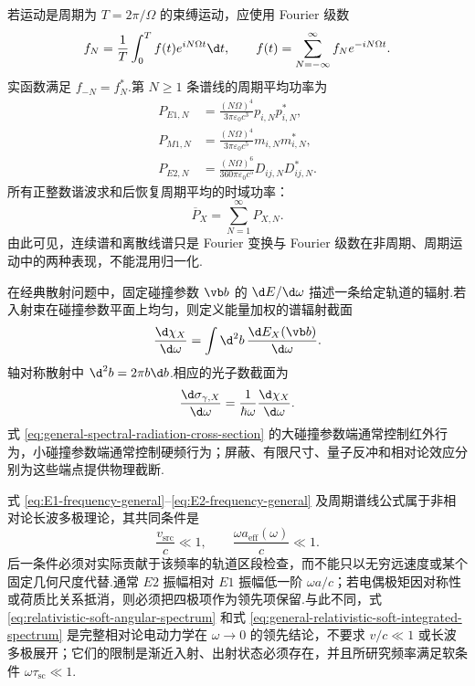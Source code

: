 若运动是周期为 $T=2\pi/\Omega$ 的束缚运动，应使用 Fourier 级数
\begin{equation}
 f_N=\frac{1}{T}\int_0^T f(t)e^{iN\Omega t}\d t,
 \qquad
 f(t)=\sum_{N=-\infty}^{\infty}f_Ne^{-iN\Omega t}.
 \label{eq:periodic-Fourier-convention-spectrum}
\end{equation}
实函数满足 $f_{-N}=f_N^*$.第 $N\geq1$ 条谱线的周期平均功率为
\begin{equation}
 \begin{aligned}
 P_{E1,N}&=\frac{(N\Omega)^4}{3\pi\varepsilon_0c^3}p_{i,N}p_{i,N}^*,\\
 P_{M1,N}&=\frac{(N\Omega)^4}{3\pi\varepsilon_0c^5}m_{i,N}m_{i,N}^*,\\
 P_{E2,N}&=\frac{(N\Omega)^6}{360\pi\varepsilon_0c^5}D_{ij,N}D_{ij,N}^*.
 \end{aligned}
 \label{eq:general-periodic-line-power}
\end{equation}
所有正整数谐波求和后恢复周期平均的时域功率：
\begin{equation}
 \overline P_X=\sum_{N=1}^{\infty}P_{X,N}.
 \label{eq:periodic-line-sum-check}
\end{equation}
由此可见，连续谱和离散线谱只是 Fourier 变换与 Fourier 级数在非周期、周期运动中的两种表现，不能混用归一化.

在经典散射问题中，固定碰撞参数 $\vb b$ 的 $\d E/\d\omega$ 描述一条给定轨道的辐射.若入射束在碰撞参数平面上均匀，则定义能量加权的谱辐射截面
\begin{equation}
 \frac{\d\chi_X}{\d\omega}
 =\int\d^2b\,\frac{\d E_X(\vb b)}{\d\omega}.
 \label{eq:general-spectral-radiation-cross-section}
\end{equation}
轴对称散射中 $\d^2b=2\pi b\d b$.相应的光子数截面为
\begin{equation}
 \frac{\d\sigma_{\gamma,X}}{\d\omega}
 =\frac{1}{\hbar\omega}\frac{\d\chi_X}{\d\omega}.
 \label{eq:general-photon-number-cross-section}
\end{equation}
式 \eqref{eq:general-spectral-radiation-cross-section} 的大碰撞参数端通常控制红外行为，小碰撞参数端通常控制硬频行为；屏蔽、有限尺寸、量子反冲和相对论效应分别为这些端点提供物理截断.

式 \eqref{eq:E1-frequency-general}--\eqref{eq:E2-frequency-general} 及周期谱线公式属于非相对论长波多极理论，其共同条件是
\begin{equation}
 \frac{v_{\mathrm{src}}}{c}\ll1,
 \qquad
 \frac{\omega a_{\mathrm{eff}}(\omega)}{c}\ll1.
 \label{eq:general-multipole-spectrum-validity}
\end{equation}
后一条件必须对实际贡献于该频率的轨道区段检查，而不能只以无穷远速度或某个固定几何尺度代替.通常 $E2$ 振幅相对 $E1$ 振幅低一阶 $\omega a/c$；若电偶极矩因对称性或荷质比关系抵消，则必须把四极项作为领先项保留.与此不同，式 \eqref{eq:relativistic-soft-angular-spectrum} 和式 \eqref{eq:general-relativistic-soft-integrated-spectrum} 是完整相对论电动力学在 $\omega\to0$ 的领先结论，不要求 $v/c\ll1$ 或长波多极展开；它们的限制是渐近入射、出射状态必须存在，并且所研究频率满足软条件 $\omega\tau_{\mathrm{sc}}\ll1$.

